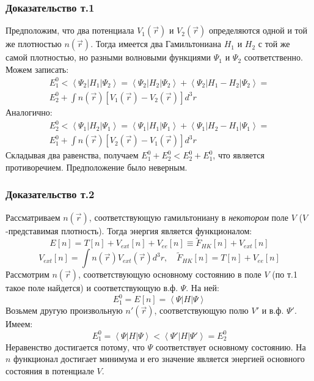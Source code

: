 \documentclass[t]{beamer}  %
\begin{document}
\begin{frame}[shrink=7]
    \frametitle{Доказательство т.1}
        Предположим, что два потенциала $V_1 (\vec{r})$ и $V_2 (\vec{r})$ определяются одной и той же плотностью $n (\vec{r})$.
        Тогда имеется два Гамильтониана $H_1$ и $H_2$ с той же самой плотностью, но разными волновыми функциями $\Psi_1$ и $\Psi_2$ соответственно. Можем записать:
        \begin{multline}
            E_1^0 < \left\langle\Psi_{2}\left|H_{1}\right| \Psi_{2}\right\rangle=
            \left\langle\Psi_{2}\left|H_{2}\right| \Psi_{2}\right\rangle+\left\langle\Psi_{2}\left|H_{1}-H_{2}\right| \Psi_{2}\right\rangle= \\
            E_{2}^{0}+\int n(\vec{r})\left[V_{1}(\vec{r})-V_{2}(\vec{r})\right] d^3 r
        \end{multline}
        Аналогично:
        \begin{multline}
            E_2^0 < \left\langle\Psi_{1}\left|H_{2}\right| \Psi_{1}\right\rangle=
            \left\langle\Psi_{1}\left|H_{1}\right| \Psi_{1}\right\rangle+\left\langle\Psi_{1}\left|H_{2}-H_{1}\right| \Psi_{1}\right\rangle= \\
            E_{1}^{0}+\int n(\vec{r})\left[V_{2}(\vec{r})-V_{1}(\vec{r})\right] d^3 r
        \end{multline}
        Складывая два равенства, получаем $E_{1}^{0}+E_{2}^{0}<E_{2}^{0}+E_{1}^{0}$, что является противоречием. Предположение было неверным.
\end{frame}

\begin{frame}[shrink=7]
    \frametitle{Доказательство т.2}
    Рассматриваем ${n (\vec{r})}$, соответствующую гамильтониану в \textit{некотором} поле $V$ ($V$-представимая плотность). Тогда энергия является функционалом:
    \begin{equation}
        E[n]=T[n]+V_{ext}[n]+V_{e e}[n] \equiv \tilde{F}_{HK}[n]+ V_{ext}[n]
    \end{equation}
    \begin{equation}
        V_{ext}[n]=\int n(\vec{r}) V_{ext}(\vec{r}) d^3 r, \quad 
        \tilde{F}_{H K}[n]=T[n]+V_{e e}[n]
    \end{equation}
    Рассмотрим $n (\vec{r})$, соответствующую основному состоянию в поле $V$ (по т.1 такое поле найдется) и соответствующую в.ф. $\Psi$.
    На ней:
    \begin{equation}
        E^{0}_1 = E[n] = \left\langle\Psi\left|H\right| \Psi\right\rangle
    \end{equation}
    Возьмем другую произвольную $n' (\vec{r})$, соответствующую полю $V'$ и в.ф. $\Psi'$. 
    Имеем:
    \begin{equation}
        E^0_1=\left\langle\Psi\left|H\right| \Psi\right\rangle
        <
        \left\langle\Psi'\left|H\right| \Psi'\right\rangle=E_2^0
    \end{equation}
    Неравенство достигается потому, что $\Psi$ соответствует основному состоянию.
    На $n$ функционал достигает минимума и его значение является энергией основного состояния в потенциале $V$.

\end{frame}
\end{document}
